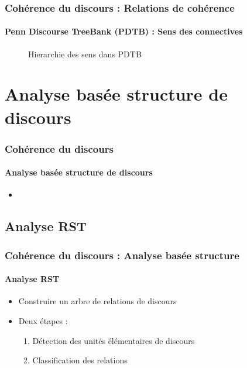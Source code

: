 \documentclass[xcolor=table]{beamer}
\begin{document}
\begin{frame}
	\frametitle{Cohérence du discours : Relations de cohérence}
	\framesubtitle{Penn Discourse TreeBank (PDTB) : Sens des connectives}
	
	\begin{figure}
		\caption{Hierarchie des sens dans PDTB \cite{2008-prasad-al}}
	\end{figure}
	
\end{frame}

\section{Analyse basée structure de discours}

\begin{frame}
	\frametitle{Cohérence du discours}
	\framesubtitle{Analyse basée structure de discours}
	
	\begin{itemize}
		\item 
	\end{itemize}
	
\end{frame}

\subsection{Analyse RST}

\begin{frame}
	\frametitle{Cohérence du discours : Analyse basée structure}
	\framesubtitle{Analyse RST}
	
	\begin{itemize}
		\item Construire un arbre de relations de discours
		\item Deux étapes : 
		\begin{enumerate}
			\item Détection des unités élémentaires de discours
			\item Classification des relations
		\end{enumerate}
	\end{itemize}

	\begin{center}
	\end{center}
	
\end{frame}
\end{document}
